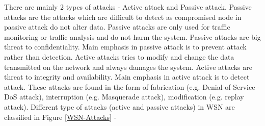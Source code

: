 There are mainly 2 types of attacks \cite{wahid2015survey}- Active attack and Passive attack. Passive attacks are the attacks which are difficult to detect as compromised node in passive attack do not alter data. Passive attacks are only used for traffic monitoring or traffic analysis and do not harm the system. Passive attacks are big threat to confidentiality. Main emphasis in passive attack is to prevent attack rather than detection. Active attacks tries to modify and change the data transmitted on the network and always damages the system. Active attacks are threat to integrity and availability. Main emphasis in active attack is to detect attack. These attacks are found in the form of fabrication (e.g. Denial of Service -DoS attack), interruption (e.g. Masquerade attack), modification (e.g. replay attack).  Different type of attacks (active and passive attacks) in WSN are classified in Figure \ref{WSN-Attacks} \cite{nayak2015impact, abirami2013sybil, singh2014survey} -

